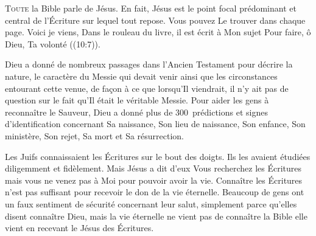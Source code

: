 





\lettrine{T}{oute} la Bible parle de Jésus.
 En fait, Jésus est le point focal prédominant et central de l'Écriture
 sur lequel tout repose. Vous pouvez Le trouver dans chaque page.
 \Og Voici\frcolon{} je viens, \ocadr Dans le rouleau du livre,
 il est écrit à Mon sujet \fcadr{}
 Pour faire, ô Dieu, Ta volonté \Fg{} ((10:7)).

Dieu a donné de nombreux passages dans l'Ancien Testament
 pour décrire la nature, le caractère du Messie qui devait venir
 ainsi que les circonstances entourant cette venue, de fa\c{c}on à ce que
 lorsqu'Il viendrait, il n'y ait pas de question sur le fait qu'Il était
 le véritable Messie. Pour aider les gens à reconnaître le Sauveur,
 Dieu a donné plus de 300~prédictions et signes d'identification
 concernant Sa naissance, Son lieu de naissance, Son enfance,
 Son ministère, Son rejet, Sa mort et Sa résurrection.


Les Juifs connaissaient les Écritures sur le bout des doigts.
 Ils les avaient étudiées diligemment et fidèlement.
 Mais Jésus a dit d'eux\frcolon{} 
 \Og Vous recherchez les Écritures mais vous ne venez pas à Moi
 pour pouvoir avoir la vie. \Fg{}
 Connaître les Écritures n'est pas suffisant pour recevoir
 le don de la vie éternelle. Beaucoup de gens ont un faux sentiment
 de sécurité concernant leur salut, simplement parce qu'elles disent
 connaître Dieu, mais la vie éternelle ne vient pas de connaître la Bible
 \ocadr elle vient en recevant le Jésus des Écritures.

